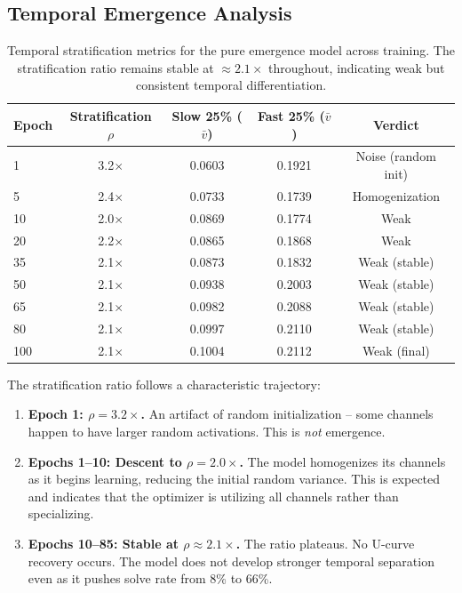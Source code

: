 \documentclass{article}
\begin{document}
\subsection{Temporal Emergence Analysis}
\label{sec:emergence_results}

\begin{table}[h]
\centering
\caption{Temporal stratification metrics for the pure emergence model across training. The stratification ratio remains stable at $\approx 2.1\times$ throughout, indicating weak but consistent temporal differentiation.}
\label{tab:stratification}
\begin{tabular}{lcccc}
\toprule
Epoch & Stratification $\rho$ & Slow 25\% ($\bar{v}$) & Fast 25\% ($\bar{v}$) & Verdict \\
\midrule
1 & 3.2$\times$ & 0.0603 & 0.1921 & Noise (random init) \\
5 & 2.4$\times$ & 0.0733 & 0.1739 & Homogenization \\
10 & 2.0$\times$ & 0.0869 & 0.1774 & Weak \\
20 & 2.2$\times$ & 0.0865 & 0.1868 & Weak \\
35 & 2.1$\times$ & 0.0873 & 0.1832 & Weak (stable) \\
50 & 2.1$\times$ & 0.0938 & 0.2003 & Weak (stable) \\
65 & 2.1$\times$ & 0.0982 & 0.2088 & Weak (stable) \\
80 & 2.1$\times$ & 0.0997 & 0.2110 & Weak (stable) \\
100 & 2.1$\times$ & 0.1004 & 0.2112 & Weak (final) \\
\bottomrule
\end{tabular}
\end{table}

The stratification ratio follows a characteristic trajectory:

\begin{enumerate}
    \item \textbf{Epoch 1: $\rho = 3.2\times$.} An artifact of random initialization -- some channels happen to have larger random activations. This is \emph{not} emergence.
    \item \textbf{Epochs 1--10: Descent to $\rho = 2.0\times$.} The model homogenizes its channels as it begins learning, reducing the initial random variance. This is expected and indicates that the optimizer is utilizing all channels rather than specializing.
    \item \textbf{Epochs 10--85: Stable at $\rho \approx 2.1\times$.} The ratio plateaus. No U-curve recovery occurs. The model does not develop stronger temporal separation even as it pushes solve rate from 8\% to 66\%.
\end{enumerate}
\end{document}
